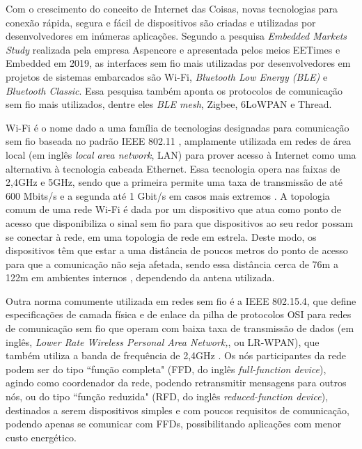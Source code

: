 \documentclass[../monografia.tex]{subfiles}
\begin{document}
Com o crescimento do conceito de Internet das Coisas, novas tecnologias para conexão rápida, segura e fácil de dispositivos são criadas e utilizadas por desenvolvedores em inúmeras aplicações. Segundo a pesquisa \textit{Embedded Markets Study} realizada pela empresa Aspencore \cite{embedded-market-study} e apresentada pelos meios EETimes \cite{eetimes} e Embedded \cite{embedded} em 2019, as interfaces sem fio mais utilizadas por desenvolvedores em  projetos de sistemas embarcados são Wi-Fi, \textit{Bluetooth Low Energy (BLE)} e \textit{Bluetooth Classic}. Essa pesquisa também aponta os protocolos de comunicação sem fio mais utilizados, dentre eles \textit{BLE mesh}, Zigbee, 6LoWPAN e Thread. 

Wi-Fi é o nome dado a uma família de tecnologias designadas para comunicação sem fio baseada no padrão IEEE 802.11 \cite{802.11}, amplamente utilizada em redes de área local (em inglês \textit{local area network}, LAN) para prover acesso à Internet como uma alternativa à tecnologia cabeada Ethernet. Essa tecnologia opera nas faixas de 2,4GHz e 5GHz, sendo que a primeira permite uma taxa de transmissão de até 600 Mbits/s e a segunda até 1 Gbit/s em casos mais extremos \cite{Wi-Fi-datarate}. A topologia comum de uma rede Wi-Fi é dada por um  dispositivo que atua como ponto de acesso que disponibiliza o sinal sem fio para que dispositivos ao seu redor possam se conectar à rede, em uma topologia de rede em estrela. Deste modo, os dispositivos têm que estar a uma distância de poucos metros do ponto de acesso para que a comunicação não seja afetada, sendo essa distância cerca de 76m a 122m em ambientes internos \cite{wifi-range}, dependendo da antena utilizada.

Outra norma comumente utilizada em redes sem fio é a IEEE 802.15.4, que define especificações de camada física e de enlace da pilha de protocolos OSI para redes de comunicação sem fio que operam com baixa taxa de transmissão de dados (em inglês, \textit{Lower Rate Wireless Personal Area Network,}, ou LR-WPAN), que também utiliza a banda de frequência de 2,4GHz \cite{802.15.4}. Os nós participantes da rede podem ser do tipo ``função completa" (FFD, do inglês \textit{full-function device}), agindo como coordenador da rede, podendo retransmitir mensagens para outros nós, ou do tipo ``função reduzida" (RFD, do inglês \textit{reduced-function device}), destinados a serem dispositivos simples e com poucos requisitos de comunicação, podendo apenas se comunicar com FFDs, possibilitando aplicações com menor custo energético. 
\end{document}
